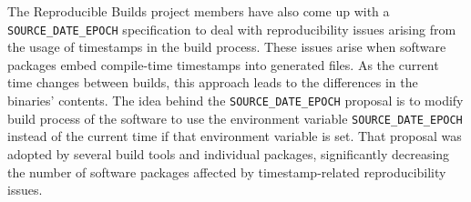 {The Reproducible Builds project members have also come up with a \texttt{SOURCE\_DATE\_EPOCH} specification\autocite{SDEspec} to deal with reproducibility issues arising from the usage of timestamps in the build process.
These issues arise when software packages embed compile-time timestamps into generated files. As the current time changes between builds, this approach leads to the differences in the binaries' contents. 
The idea behind the \texttt{SOURCE\_DATE\_EPOCH} proposal is to modify build process of the software to use the environment variable \texttt{SOURCE\_DATE\_EPOCH} instead of the current time if that environment variable is set. 
That proposal was adopted by several build tools and individual packages\autocite{SDEproposal}, significantly decreasing the number of software packages affected by timestamp-related reproducibility issues.\\


}




